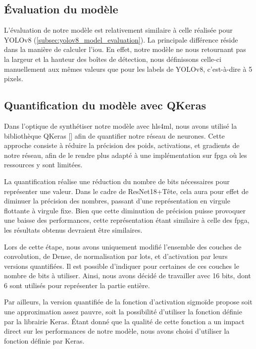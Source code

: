 \break

\subsection{Évaluation du modèle}

L'évaluation de notre modèle est relativement similaire à celle réalisée pour YOLOv8 (\ref{subsec:yolov8_model_evaluation}). La principale différence réside dans la manière de calculer l'\acrshort{iou}. En effet, notre modèle ne nous retournant pas la largeur et la hauteur des boîtes de détection, nous définissons celle-ci manuellement aux mêmes valeurs que pour les labels de YOLOv8, c'est-à-dire à 5 pixels.

\subsection{Quantification du modèle avec QKeras}
\label{subsec:qkeras_quantization}

Dans l'optique de synthétiser notre modèle avec \acrshort{hls4ml}, nous avons utilisé la bibliothèque QKeras [\cite{noauthor_qkeras_2023}] afin de quantifier notre réseau de neurones. Cette approche consiste à réduire la précision des poids, activations, et gradients de notre réseau, afin de le rendre plus adapté à une implémentation sur \acrshort{fpga} où les ressources y sont limitées.

La quantification réalise une réduction du nombre de bits nécessaires pour représenter une valeur. Dans le cadre de ResNet18+Tête, cela aura pour effet de diminuer la précision des nombres, passant d'une représentation en virgule flottante à virgule fixe. Bien que cette diminution de précision puisse provoquer une baisse des performances, cette représentation étant similaire à celle des \acrshort{fpga}, les résultats obtenus devraient être similaires.

Lors de cette étape, nous avons uniquement modifié l'ensemble des couches de convolution, de Dense, de normalisation par lots, et d'activation par leurs versions quantifiées. Il est possible d'indiquer pour certaines de ces couches le nombre de bits à utiliser. Ainsi, nous avons décidé de travailler avec 16 bits, dont 6 sont utilisés pour représenter la partie entière.

Par ailleurs, la version quantifiée de la fonction d'activation sigmoïde propose soit une approximation assez pauvre, soit la possibilité d'utiliser la fonction définie par la librairie Keras. Étant donné que la qualité de cette fonction a un impact direct sur les performances de notre modèle, nous avons choisi d'utiliser la fonction définie par Keras.

